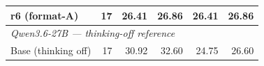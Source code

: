 \begin{table}[t]
{\begin{tabular}{lrrrrr}
r6 (format-A) & 17 & 26.41 & 26.86 & 26.41 & 26.86 \\
\midrule
\multicolumn{6}{l}{\textit{Qwen3.6-27B --- thinking-off reference}} \\
Base (thinking off) & 17 & 30.92 & 32.60 & 24.75 & 26.60 \\
\bottomrule
\end{tabular}%
}
\end{table}
